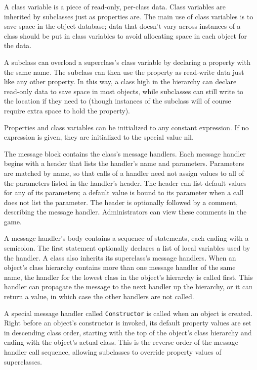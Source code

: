 \documentclass[12pt]{article}
\begin{document}
A class variable is a piece of read-only, per-class data.  Class
variables are inherited by subclasses just as properties are.  The
main use of class variables is to save space in the object database;
data that doesn't vary across instances of a class should be put in
class variables to avoid allocating space in each object for the
data.

A subclass can overload a superclass's class variable by declaring a
property with the same name.  The subclass can then use the property
as read-write data just like any other property.  In this way, a class
high in the hierarchy can declare read-only data to save space in most
objects, while subclasses can still write to the location if they need
to (though instances of the subclass will of course require extra
space to hold the property).

Properties and class variables can be initialized to any constant
expression.  If no expression is given, they are initialized to the
special value nil.

The message block contains the class's message handlers.  Each message
handler begins with a header that lists the handler's name and
parameters.  Parameters are matched by name, so that calls of a
handler need not assign values to all of the parameters listed in the
handler's header.  The header can list default values for any of its
parameters; a default value is bound to its parameter when a call does
not list the parameter.  The header is optionally followed by a
comment, describing the message handler.  Administrators can view
these comments in the game.

A message handler's body contains a sequence of statements, each
ending with a semicolon.  The first statement optionally declares a
list of local variables used by the handler.  A class also inherits
its superclass's message handlers.  When an object's class hierarchy
contains more than one message handler of the same name, the handler
for the lowest class in the object's hierarchy is called first.  This
handler can propagate the message to the next handler up the
hierarchy, or it can return a value, in which case the other handlers
are not called.

A special message handler called {\tt Constructor} is called when an
object is created.  Right before an object's constructor is invoked,
its default property values are set in descending class order,
starting with the top of the object's class hierarchy and ending with
the object's actual class.  This is the reverse order of the message
handler call sequence, allowing subclasses to override property values
of superclasses.
\end{document}
